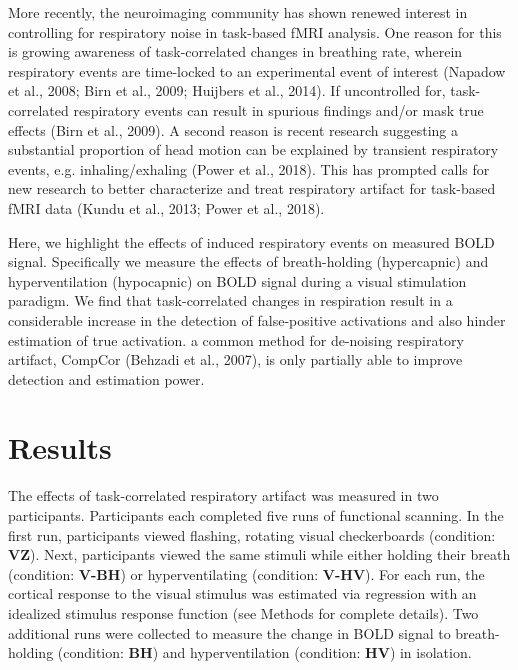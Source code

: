 \documentclass[9pt]{NEU502b-fmri}
\begin{document}
More recently, the neuroimaging community has shown renewed interest in controlling for respiratory noise in task-based fMRI analysis. One reason for this is growing awareness of task-correlated changes in breathing rate, wherein respiratory events are time-locked to an experimental event of interest (Napadow et al., 2008; Birn et al., 2009; Huijbers et al., 2014). If uncontrolled for, task-correlated respiratory events can result in spurious findings and/or mask true effects (Birn et al., 2009). A second reason is recent research suggesting a substantial proportion of head motion can be explained by transient respiratory events, e.g. inhaling/exhaling (Power et al., 2018). This has prompted calls for new research to better characterize and treat respiratory artifact for task-based fMRI data (Kundu et al., 2013; Power et al., 2018). 

Here, we highlight the effects of induced respiratory events on measured BOLD signal. Specifically we measure the effects of breath-holding (hypercapnic) and hyperventilation (hypocapnic) on BOLD signal during a visual stimulation paradigm. We find that task-correlated changes in respiration result in a considerable increase in the detection of false-positive activations and also hinder estimation of true activation. a common method for de-noising respiratory artifact, CompCor (Behzadi et al., 2007), is only partially able to improve detection and estimation power.

\section{Results}
The effects of task-correlated respiratory artifact was measured in two participants. Participants each completed five runs of functional scanning. In the first run, participants viewed flashing, rotating visual checkerboards (condition: \textbf{VZ}). Next, participants viewed the same stimuli while either holding their breath (condition: \textbf{V-BH}) or hyperventilating (condition: \textbf{V-HV}). For each run, the cortical response to the visual stimulus was estimated via regression with an idealized stimulus response function (see Methods for complete details). Two additional runs were collected to measure the change in BOLD signal to breath-holding (condition: \textbf{BH}) and hyperventilation (condition: \textbf{HV}) in isolation. 
\end{document}

